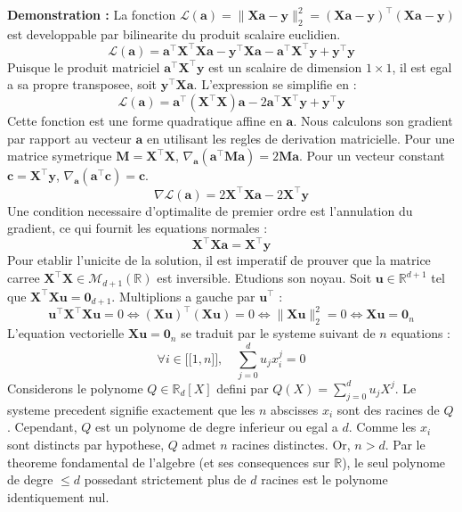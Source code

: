 \documentclass[11pt,a4paper]{report}
\begin{document}
\textbf{Demonstration :}
La fonction $\mathcal{L}(\mathbf{a}) = \|\mathbf{X}\mathbf{a} - \mathbf{y}\|_2^2 = (\mathbf{X}\mathbf{a} - \mathbf{y})^\top(\mathbf{X}\mathbf{a} - \mathbf{y})$ est developpable par bilinearite du produit scalaire euclidien.
$$ \mathcal{L}(\mathbf{a}) = \mathbf{a}^\top\mathbf{X}^\top\mathbf{X}\mathbf{a} - \mathbf{y}^\top\mathbf{X}\mathbf{a} - \mathbf{a}^\top\mathbf{X}^\top\mathbf{y} + \mathbf{y}^\top\mathbf{y} $$
Puisque le produit matriciel $\mathbf{a}^\top\mathbf{X}^\top\mathbf{y}$ est un scalaire de dimension $1 \times 1$, il est egal a sa propre transposee, soit $\mathbf{y}^\top\mathbf{X}\mathbf{a}$. L'expression se simplifie en :
$$ \mathcal{L}(\mathbf{a}) = \mathbf{a}^\top(\mathbf{X}^\top\mathbf{X})\mathbf{a} - 2\mathbf{a}^\top\mathbf{X}^\top\mathbf{y} + \mathbf{y}^\top\mathbf{y} $$
Cette fonction est une forme quadratique affine en $\mathbf{a}$. Nous calculons son gradient par rapport au vecteur $\mathbf{a}$ en utilisant les regles de derivation matricielle. Pour une matrice symetrique $\mathbf{M} = \mathbf{X}^\top\mathbf{X}$, $\nabla_{\mathbf{a}} (\mathbf{a}^\top\mathbf{M}\mathbf{a}) = 2\mathbf{M}\mathbf{a}$. Pour un vecteur constant $\mathbf{c} = \mathbf{X}^\top\mathbf{y}$, $\nabla_{\mathbf{a}} (\mathbf{a}^\top\mathbf{c}) = \mathbf{c}$.
$$ \nabla \mathcal{L}(\mathbf{a}) = 2\mathbf{X}^\top\mathbf{X}\mathbf{a} - 2\mathbf{X}^\top\mathbf{y} $$
Une condition necessaire d'optimalite de premier ordre est l'annulation du gradient, ce qui fournit les equations normales :
$$ \mathbf{X}^\top\mathbf{X}\mathbf{a} = \mathbf{X}^\top\mathbf{y} $$
Pour etablir l'unicite de la solution, il est imperatif de prouver que la matrice carree $\mathbf{X}^\top\mathbf{X} \in \mathcal{M}_{d+1}(\mathbb{R})$ est inversible. Etudions son noyau.
Soit $\mathbf{u} \in \mathbb{R}^{d+1}$ tel que $\mathbf{X}^\top\mathbf{X}\mathbf{u} = \mathbf{0}_{d+1}$.
Multiplions a gauche par $\mathbf{u}^\top$ :
$$ \mathbf{u}^\top\mathbf{X}^\top\mathbf{X}\mathbf{u} = 0 \iff (\mathbf{X}\mathbf{u})^\top(\mathbf{X}\mathbf{u}) = 0 \iff \|\mathbf{X}\mathbf{u}\|_2^2 = 0 \iff \mathbf{X}\mathbf{u} = \mathbf{0}_n $$
L'equation vectorielle $\mathbf{X}\mathbf{u} = \mathbf{0}_n$ se traduit par le systeme suivant de $n$ equations :
$$ \forall i \in \mathopen{[\![} 1, n \mathclose{]\!]}, \quad \sum_{j=0}^{d} u_j x_i^j = 0 $$
Considerons le polynome $Q \in \mathbb{R}_d[X]$ defini par $Q(X) = \sum_{j=0}^{d} u_j X^j$. Le systeme precedent signifie exactement que les $n$ abscisses $x_i$ sont des racines de $Q$.
Cependant, $Q$ est un polynome de degre inferieur ou egal a $d$. Comme les $x_i$ sont distincts par hypothese, $Q$ admet $n$ racines distinctes. Or, $n > d$. Par le theoreme fondamental de l'algebre (et ses consequences sur $\mathbb{R}$), le seul polynome de degre $\le d$ possedant strictement plus de $d$ racines est le polynome identiquement nul.
\end{document}
